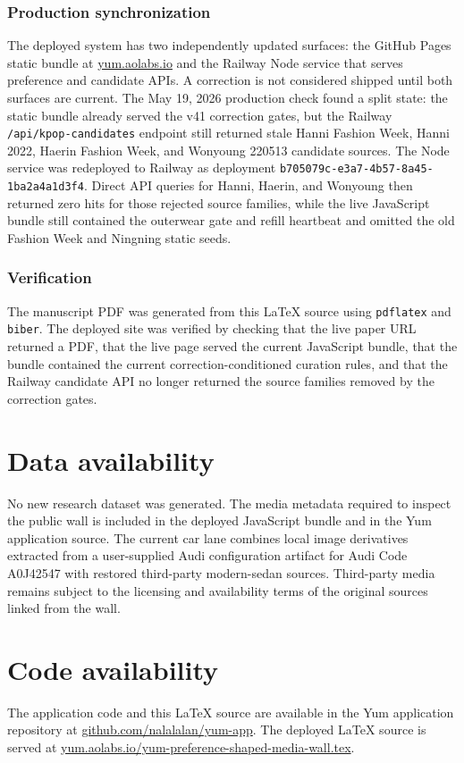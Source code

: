 \documentclass[12pt,letterpaper]{article}
\newcommand{\backmattersection}[1]{\section*{#1}\markboth{#1}{}}
\begin{document}
\subsubsection*{Production synchronization}

The deployed system has two independently updated surfaces: the GitHub Pages static bundle at \href{https://yum.aolabs.io}{yum.aolabs.io} and the Railway Node service that serves preference and candidate APIs. A correction is not considered shipped until both surfaces are current. The May 19, 2026 production check found a split state: the static bundle already served the v41 correction gates, but the Railway \texttt{/api/kpop-candidates} endpoint still returned stale Hanni Fashion Week, Hanni 2022, Haerin Fashion Week, and Wonyoung 220513 candidate sources. The Node service was redeployed to Railway as deployment \texttt{b705079c-e3a7-4b57-8a45-1ba2a4a1d3f4}. Direct API queries for Hanni, Haerin, and Wonyoung then returned zero hits for those rejected source families, while the live JavaScript bundle still contained the outerwear gate and refill heartbeat and omitted the old Fashion Week and Ningning static seeds.

\subsubsection*{Verification}

The manuscript PDF was generated from this LaTeX source using \texttt{pdflatex} and \texttt{biber}. The deployed site was verified by checking that the live paper URL returned a PDF, that the live page served the current JavaScript bundle, that the bundle contained the current correction-conditioned curation rules, and that the Railway candidate API no longer returned the source families removed by the correction gates.

\backmattersection{Data availability}

No new research dataset was generated. The media metadata required to inspect the public wall is included in the deployed JavaScript bundle and in the Yum application source. The current car lane combines local image derivatives extracted from a user-supplied Audi configuration artifact for Audi Code A0J42547 with restored third-party modern-sedan sources. Third-party media remains subject to the licensing and availability terms of the original sources linked from the wall.

\backmattersection{Code availability}

The application code and this LaTeX source are available in the Yum application repository at \href{https://github.com/nalalalan/yum-app}{github.com/nalalalan/yum-app}. The deployed LaTeX source is served at \href{https://yum.aolabs.io/yum-preference-shaped-media-wall.tex}{yum.aolabs.io/yum-preference-shaped-media-wall.tex}.
\end{document}
